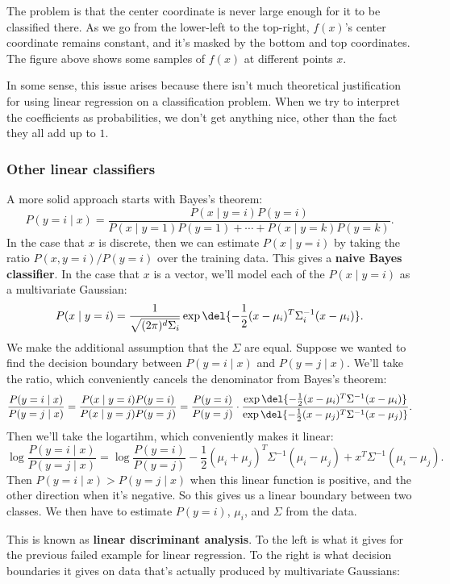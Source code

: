 \documentclass[11pt,paper=letter]{scrartcl}
\begin{document}
The problem is that the center coordinate is never large enough for it to be classified there. As we go from the lower-left to the top-right, $f(x)$'s center coordinate remains constant, and it's masked by the bottom and top coordinates. The figure above shows some samples of $f(x)$ at different points $x$.

In some sense, this issue arises because there isn't much theoretical justification for using linear regression on a classification problem. When we try to interpret the coefficients as probabilities, we don't get anything nice, other than the fact they all add up to $1$.

\subsubsection*{Other linear classifiers}

A more solid approach starts with Bayes's theorem:\[
  P(y = i \mid x) = \frac{P(x \mid y = i)P(y = i)}{P(x \mid y = 1)P(y = 1) + \cdots + P(x \mid y = k)P(y = k)}.
\]
In the case that $x$ is discrete, then we can estimate $P(x \mid y = i)$ by taking the ratio $P(x, y = i)/P(y = i)$ over the training data. This gives a \textbf{naive Bayes classifier}. In the case that $x$ is a vector, we'll model each of the $P(x \mid y = i)$ as a multivariate Gaussian:\[
  P(x \mid y = i) = \frac{1}{\sqrt{(2\pi)^d \Sigma_i}}\exp\del{-\frac{1}{2}(x - \mu_i)^T\Sigma_i^{-1}(x - \mu_i)}.
\]
We make the additional assumption that the $\Sigma$ are equal. Suppose we wanted to find the decision boundary between $P(y = i \mid x)$ and $P(y = j \mid x)$. We'll take the ratio, which conveniently cancels the denominator from Bayes's theorem: \[
  \frac{P(y = i \mid x)}{P(y = j \mid x)} = \frac{P(x \mid y = i)P(y = i)}{P(x \mid y = j)P(y = j)} = \frac{P(y = i)}{P(y = j)} \cdot \frac{\exp\del{-\frac{1}{2}(x - \mu_i)^T\Sigma^{-1}(x - \mu_i)}}{\exp\del{-\frac{1}{2}(x - \mu_j)^T\Sigma^{-1}(x - \mu_j)}}.
\]
Then we'll take the logartihm, which conveniently makes it linear: \[
  \log \frac{P(y = i \mid x)}{P(y = j \mid x)} = \log \frac{P(y = i)}{P(y = j)} - \frac{1}{2}\left(\mu_i + \mu_j\right)^T\Sigma^{-1}(\mu_i - \mu_j) + x^T\Sigma^{-1}(\mu_i - \mu_j).
\]
Then $P(y = i \mid x) > P(y = j \mid x)$ when this linear function is positive, and the other direction when it's negative. So this gives us a linear boundary between two classes. We then have to estimate $P(y = i)$, $\mu_i$, and $\Sigma$ from the data.

This is known as \textbf{linear discriminant analysis}. To the left is what it gives for the previous failed example for linear regression. To the right is what decision boundaries it gives on data that's actually produced by multivariate Gaussians:
\end{document}
